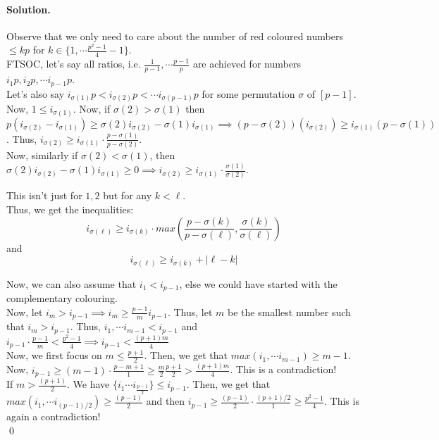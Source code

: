 \documentclass[12pt]{article}
\newenvironment{solution}
{\paragraph{Solution.}}
{\qed\eject}
\begin{document}
\begin{solution}
    Observe that we only need to care about the number of red coloured numbers $\le kp$ for $k\in \{1,\cdots \frac{p^2-1}{4}-1\}$.\\

    FTSOC, let's say all ratios, i.e. $\frac{1}{p-1}, \cdots \frac{p-1}{p}$ are achieved for numbers $i_1p, i_2p,\cdots i_{p-1}p$. \\

    Let's also say $i_{\sigma(1)}p<i_{\sigma(2)}p<\cdots i_{\sigma(p-1)}p$ for some permutation $\sigma$ of $[p-1]$.\\

    Now, $1\le i_{\sigma(1)}$. Now, if $\sigma(2)>\sigma(1)$ then $p(i_{\sigma(2)}-i_{\sigma(1)})\ge \sigma(2)i_{\sigma(2)}-\sigma(1)i_{\sigma(1)}\implies (p-\sigma(2))(i_{\sigma(2)})\ge i_{\sigma(1)}(p-\sigma(1))$. Thus, $i_{\sigma(2)}\ge i_{\sigma(1)}\cdot \frac{p-\sigma(1)}{p-\sigma(2)}$.\\

    Now, similarly if $\sigma(2)<\sigma(1)$, then $\sigma(2)i_{\sigma(2)}-\sigma(1)i_{\sigma(1)}\ge 0\implies i_{\sigma(2)}\ge i_{\sigma(1)}\cdot \frac{\sigma(1)}{\sigma(2)}$.

    This isn't just for $1,2$ but for any $k<\ell$.\\

    Thus, we get the inequalities: \[i_{\sigma(\ell)}\ge i_{\sigma(k)}\cdot max\left(\frac{p-\sigma(k)}{p-\sigma(\ell)}, \frac{\sigma(k)}{\sigma(\ell)}\right)\] and \[i_{\sigma(\ell)}\ge i_{\sigma(k)}+|\ell-k|\]

    Now, we can also assume that $i_1<i_{p-1}$, else we could have started with the complementary colouring.\\

    Now, let $i_m>i_{p-1}\implies i_m\ge \frac{p-1}{m}i_{p-1}$. Thus, let $m$ be the smallest number such that $i_m>i_{p-1}$. Thus, $i_1,\cdots i_{m-1}<i_{p-1}$ and $i_{p-1}\cdot \frac{p-1}{m}<\frac{p^2-1}{4}\implies i_{p-1}<\frac{(p+1)m}{4}$\\
    
    Now, we first focus on $m\le \frac{p+1}{2}$. Then, we get that $max(i_1,\cdots i_{m-1})\ge m-1$. Now, $i_{p-1}\ge (m-1)\cdot \frac{p-m+1}{1}\ge \frac{m}{2}\frac{p+1}{2}>\frac{(p+1)m}{4}$. This is a contradiction!\\
    
    If $m>\frac{(p+1)}{2}$. We have $\{i_1\cdots i_{\frac{p-1}{2}}\}\le i_{p-1}$. Then, we get that $max(i_1,\cdots i_{(p-1)/2})\ge \frac{(p-1)}{2}$ and then $i_{p-1}\ge \frac{(p-1)}{2}\cdot \frac{(p+1)/2}{1}\ge \frac{p^2-1}{4}$. This is again a contradiction!\\


\end{solution}
\end{document}
